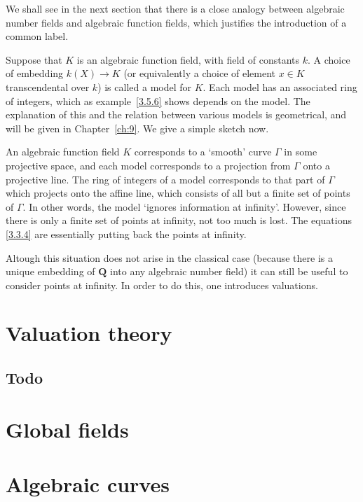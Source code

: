\documentclass[10pt]{article}
\theoremstyle{definition}
\def\QQ{\mathbf{Q}}
\def\qw#1{`#1'}
\begin{document}
We shall see in the next section that there is a close analogy between algebraic number fields and algebraic function fields, which justifies the introduction of a common label.

Suppose that $K$ is an algebraic function field, with field of constants $k$.
A choice of embedding $k(X) \to K$ (or equivalently a choice of element $x \in K$ transcendental over $k$) is called a model for $K$.
Each model has an associated ring of integers, which as example~\ref{3.5.6} shows depends on the model.
The explanation of this and the relation between various models is geometrical, and will be given in Chapter~\ref{ch:9}.
We give a simple sketch now.

\begin{figure}[h]
\end{figure}

An algebraic function field $K$ corresponds to a \qw{smooth} curve $\Gamma$ in some projective space, and each model corresponds to a projection from $\Gamma$ onto a projective line.
The ring of integers of a model corresponds to that part of $\Gamma$ which projects onto the affine line, which consists of all but a finite set of points of $\Gamma$.
In other words, the model \qw{ignores information at infinity}.
However, since there is only a finite set of points at infinity, not too much is lost.
The equations \eqref{3.3.4} are essentially putting back the points at infinity.

Altough this situation does not arise in the classical case (because there is a unique embedding of $\QQ$ into any algebraic number field) it can still be useful to consider points at infinity.
In order to do this, one introduces valuations.



\section{Valuation theory}
\label{ch:4}

\subsection{Todo}
\label{ch:4.7}

\section{Global fields}
\label{ch:5}

\section{Algebraic curves}
\label{ch:6}
\end{document}
